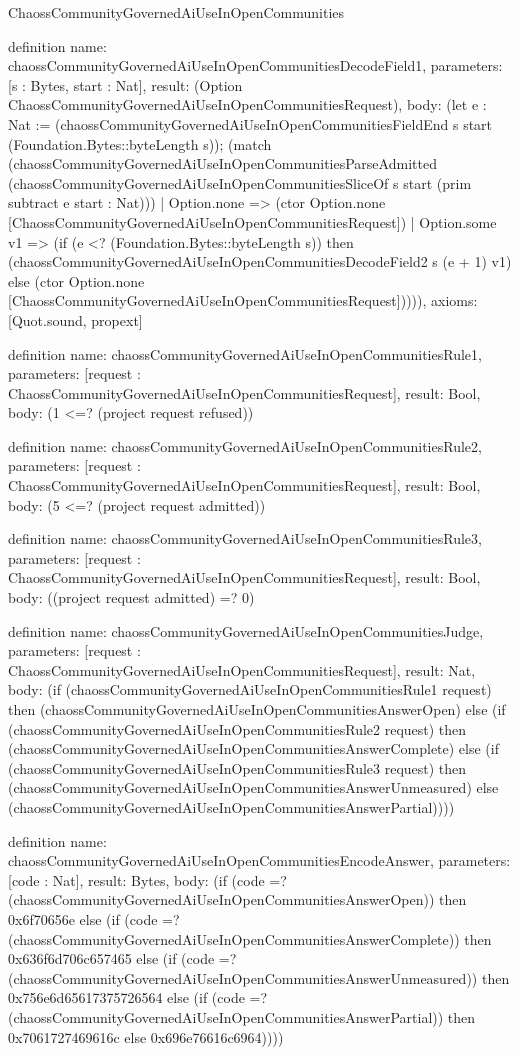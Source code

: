 \begin{lexlean}{ChaossCommunityGovernedAiUseInOpenCommunities}
\begin{semanticmodule}
definition{
  name: chaossCommunityGovernedAiUseInOpenCommunitiesDecodeField1,
  parameters: [s : Bytes, start : Nat],
  result: (Option ChaossCommunityGovernedAiUseInOpenCommunitiesRequest),
  body: (let e : Nat := (chaossCommunityGovernedAiUseInOpenCommunitiesFieldEnd s start (Foundation.Bytes::byteLength s)); (match (chaossCommunityGovernedAiUseInOpenCommunitiesParseAdmitted (chaossCommunityGovernedAiUseInOpenCommunitiesSliceOf s start (prim subtract e start : Nat)))
    | Option.none => (ctor Option.none [ChaossCommunityGovernedAiUseInOpenCommunitiesRequest])
    | Option.some v1 => (if (e <? (Foundation.Bytes::byteLength s)) then (chaossCommunityGovernedAiUseInOpenCommunitiesDecodeField2 s (e + 1) v1) else (ctor Option.none [ChaossCommunityGovernedAiUseInOpenCommunitiesRequest])))),
  axioms: [Quot.sound, propext]
}

definition{
  name: chaossCommunityGovernedAiUseInOpenCommunitiesRule1,
  parameters: [request : ChaossCommunityGovernedAiUseInOpenCommunitiesRequest],
  result: Bool,
  body: (1 <=? (project request refused))
}

definition{
  name: chaossCommunityGovernedAiUseInOpenCommunitiesRule2,
  parameters: [request : ChaossCommunityGovernedAiUseInOpenCommunitiesRequest],
  result: Bool,
  body: (5 <=? (project request admitted))
}

definition{
  name: chaossCommunityGovernedAiUseInOpenCommunitiesRule3,
  parameters: [request : ChaossCommunityGovernedAiUseInOpenCommunitiesRequest],
  result: Bool,
  body: ((project request admitted) =? 0)
}

definition{
  name: chaossCommunityGovernedAiUseInOpenCommunitiesJudge,
  parameters: [request : ChaossCommunityGovernedAiUseInOpenCommunitiesRequest],
  result: Nat,
  body: (if (chaossCommunityGovernedAiUseInOpenCommunitiesRule1 request) then (chaossCommunityGovernedAiUseInOpenCommunitiesAnswerOpen) else (if (chaossCommunityGovernedAiUseInOpenCommunitiesRule2 request) then (chaossCommunityGovernedAiUseInOpenCommunitiesAnswerComplete) else (if (chaossCommunityGovernedAiUseInOpenCommunitiesRule3 request) then (chaossCommunityGovernedAiUseInOpenCommunitiesAnswerUnmeasured) else (chaossCommunityGovernedAiUseInOpenCommunitiesAnswerPartial))))
}

definition{
  name: chaossCommunityGovernedAiUseInOpenCommunitiesEncodeAnswer,
  parameters: [code : Nat],
  result: Bytes,
  body: (if (code =? (chaossCommunityGovernedAiUseInOpenCommunitiesAnswerOpen)) then 0x6f70656e else (if (code =? (chaossCommunityGovernedAiUseInOpenCommunitiesAnswerComplete)) then 0x636f6d706c657465 else (if (code =? (chaossCommunityGovernedAiUseInOpenCommunitiesAnswerUnmeasured)) then 0x756e6d65617375726564 else (if (code =? (chaossCommunityGovernedAiUseInOpenCommunitiesAnswerPartial)) then 0x7061727469616c else 0x696e76616c6964))))
}


\end{semanticmodule}
\end{lexlean}
